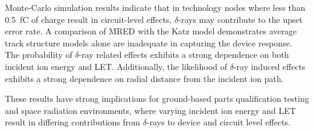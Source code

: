  Monte-Carlo simulation results indicate that in technology nodes where less than 0.5~fC of charge result in circuit-level effects, $\delta$-rays may contribute to the upset error rate.
 A comparison of MRED with the Katz model demonstrates average track structure models alone are inadequate in capturing the device response.
 The probability of $\delta$-ray related effects exhibits a strong dependence on both incident ion energy and LET.
 Additionally, the likelihood of $\delta$-ray induced effects exhibits a strong dependence on radial distance from the incident ion path.
 
 These results have strong implications for ground-based parts qualification testing and space radiation environments, where varying incident ion energy and LET result in differing contributions from $\delta$-rays to device and circuit level effects.
